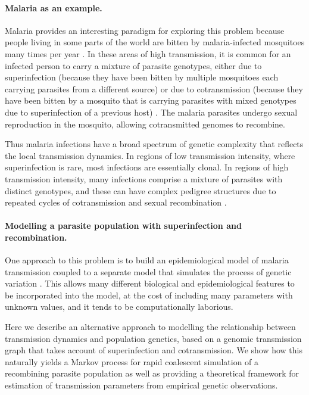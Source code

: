 \documentclass[_main.tex]{subfiles}
\begin{document}
\paragraph{Malaria as an example.} 

Malaria provides an interesting paradigm for exploring this problem because people living in some parts of the world are bitten by malaria-infected mosquitoes many times per year \cite{Smith2005,WHO2022}.  In these areas of high transmission, it is common for an infected person to carry a mixture of parasite genotypes, either due to superinfection (because they have been bitten by multiple mosquitoes each carrying parasites from a different source) or due to cotransmission (because they have been bitten by a mosquito that is carrying parasites with mixed genotypes due to superinfection of a previous host) \cite{Nkhoma2020}.  The malaria parasites undergo sexual reproduction in the mosquito, allowing cotransmitted genomes to recombine.

Thus malaria infections have a broad spectrum of genetic complexity that reflects the local transmission dynamics.  In regions of low transmission intensity, where superinfection is rare, most infections are essentially clonal.  In regions of high transmission intensity, many infections comprise a mixture of parasites with distinct genotypes, and these can have complex pedigree structures due to repeated cycles of cotransmission and sexual recombination \cite{Nkhoma2020}. 

\paragraph{Modelling a parasite population with superinfection and recombination.} 

One approach to this problem is to build an epidemiological model of malaria transmission coupled to a separate model that simulates the process of genetic variation \cite{Daniels2015,Watson2020,Hendry2021}.  This allows many different biological and epidemiological features to be incorporated into the model, at the cost of including many parameters with unknown values, and it tends to be computationally laborious.  

Here we describe an alternative approach to modelling the relationship between transmission dynamics and population genetics, based on a genomic transmission graph that takes account of superinfection and cotransmission.  We show how this naturally yields a Markov process for rapid coalescent simulation of a recombining parasite population as well as providing a theoretical framework for estimation of transmission parameters from empirical genetic observations.  
\end{document}
